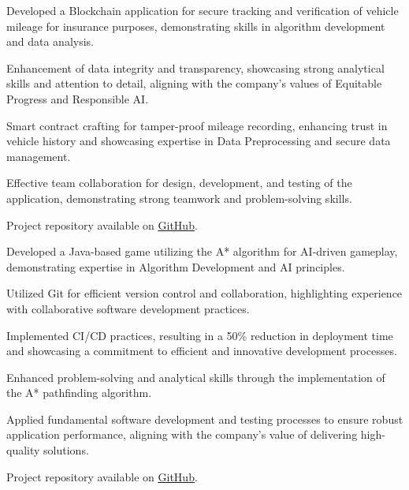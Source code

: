 \begin{minipage}[t]{0.63\textwidth}
    \vspace{5pt}
    \begin{tightemize}
      \item Developed a Blockchain application for secure tracking and verification of vehicle mileage for insurance purposes, demonstrating skills in algorithm development and data analysis.
      \item Enhancement of data integrity and transparency, showcasing strong analytical skills and attention to detail, aligning with the company's values of Equitable Progress and Responsible AI.
      \item Smart contract crafting for tamper-proof mileage recording, enhancing trust in vehicle history and showcasing expertise in Data Preprocessing and secure data management.
      \item Effective team collaboration for design, development, and testing of the application, demonstrating strong teamwork and problem-solving skills.
      \item Project repository available on \href{https://github.com/vmsaif/blockChainCarMilageTracker}{\underline{GitHub}}.
    \end{tightemize}
  \sectionsep

    \vspace{5pt}
    \begin{tightemize}
      \item Developed a Java-based game utilizing the A* algorithm for AI-driven gameplay, demonstrating expertise in Algorithm Development and AI principles.
      \item Utilized Git for efficient version control and collaboration, highlighting experience with collaborative software development practices.
      \item Implemented CI/CD practices, resulting in a 50\% reduction in deployment time and showcasing a commitment to efficient and innovative development processes.
      \item Enhanced problem-solving and analytical skills through the implementation of the A* pathfinding algorithm.
      \item Applied fundamental software development and testing processes to ensure robust application performance, aligning with the company's value of delivering high-quality solutions.
      \item Project repository available on \href{https://github.com/vmsaif/ant-path-finding-using-A-Star-algorithm}{\underline{GitHub}}.
    \end{tightemize}
  \sectionsep
  
\end{minipage}
